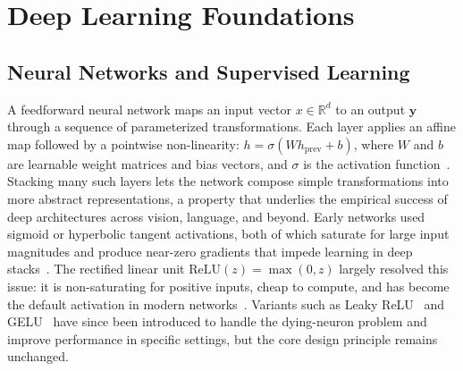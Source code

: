 \section{Deep Learning Foundations} \label{sec:21-background-deeplearning}
\subsection{Neural Networks and Supervised Learning} \label{sec:21-background-deeplearning-nn}
\begin{foldable}
  A feedforward neural network maps an input vector $x \in \mathbb{R}^{d}$ to an output $\hat{\mathbf{y}}$ through a sequence of parameterized transformations.
  Each layer applies an affine map followed by a pointwise non-linearity: $h = \sigma(Wh_{\text{prev}} + b)$, where $W$ and $b$ are learnable weight matrices and bias vectors, and $\sigma$ is the activation function~\cite{rumelhart1986learning}.
  Stacking many such layers lets the network compose simple transformations into more abstract representations, a property that underlies the empirical success of deep architectures across vision, language, and beyond.
  Early networks used sigmoid or hyperbolic tangent activations, both of which saturate for large input magnitudes and produce near-zero gradients that impede learning in deep stacks~\cite{bengio1994learning}.
  The rectified linear unit $\text{ReLU}(z) = \max(0, z)$ largely resolved this issue: it is non-saturating for positive inputs, cheap to compute, and has become the default activation in modern networks~\cite{glorot2011deep}.
  Variants such as Leaky ReLU~\cite{maas2013rectifier} and GELU~\cite{hendrycks2017gaussian} have since been introduced to handle the dying-neuron problem and improve performance in specific settings, but the core design principle remains unchanged.
\end{foldable}

